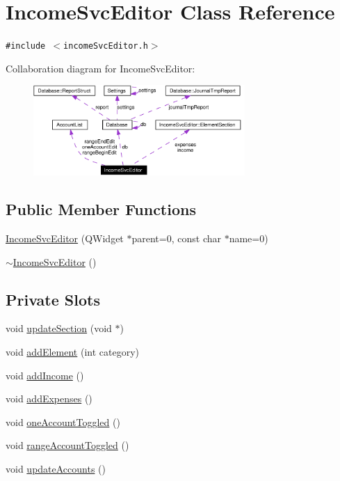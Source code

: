 \hypertarget{classIncomeSvcEditor}{
\section{Income\-Svc\-Editor Class Reference}
\label{classIncomeSvcEditor}
}
{\tt \#include $<$income\-Svc\-Editor.h$>$}

Collaboration diagram for Income\-Svc\-Editor:\begin{figure}[H]
\begin{center}
\leavevmode
\includegraphics[width=228pt]{classIncomeSvcEditor__coll__graph}
\end{center}
\end{figure}
\subsection*{Public Member Functions}
\begin{CompactItemize}
\item 
\hyperlink{classIncomeSvcEditor_a0}{Income\-Svc\-Editor} (QWidget $\ast$parent=0, const char $\ast$name=0)
\item 
\hyperlink{classIncomeSvcEditor_a1}{$\sim$Income\-Svc\-Editor} ()
\end{CompactItemize}
\subsection*{Private Slots}
\begin{CompactItemize}
\item 
void \hyperlink{classIncomeSvcEditor_k0}{update\-Section} (void $\ast$)
\item 
void \hyperlink{classIncomeSvcEditor_k1}{add\-Element} (int category)
\item 
void \hyperlink{classIncomeSvcEditor_k2}{add\-Income} ()
\item 
void \hyperlink{classIncomeSvcEditor_k3}{add\-Expenses} ()
\item 
void \hyperlink{classIncomeSvcEditor_k4}{one\-Account\-Toggled} ()
\item 
void \hyperlink{classIncomeSvcEditor_k5}{range\-Account\-Toggled} ()
\item 
void \hyperlink{classIncomeSvcEditor_k6}{update\-Accounts} ()
\end{CompactItemize}
